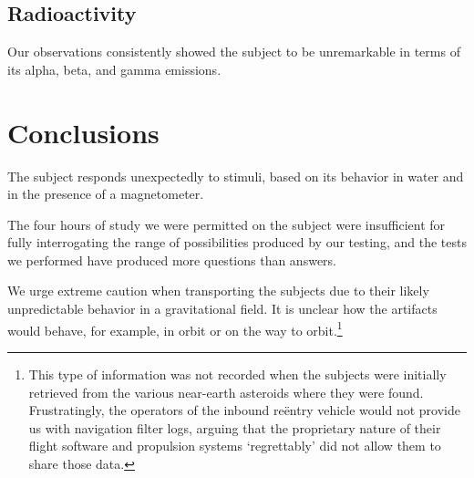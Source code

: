 \documentclass[10pt]{article}
\theoremstyle{definition}
\begin{document}
\subsection{Radioactivity}
Our observations consistently showed the subject to be unremarkable in terms of its alpha, beta, and gamma emissions.

\section{Conclusions}\label{conclusions}
The subject responds unexpectedly to stimuli, based on its behavior in water and in the presence of a magnetometer.

 
The four hours of study we were permitted on the subject were insufficient for fully interrogating the range of possibilities produced by our testing, and the tests we performed have produced more questions than answers.

We urge extreme caution when transporting the subjects due to their likely unpredictable behavior in a gravitational field.
It is unclear how the artifacts would behave, for example, in orbit or on the way to orbit.\footnote{This type of information was not recorded when the subjects were initially retrieved from the various near-earth asteroids where they were found. Frustratingly, the operators of the inbound re\"entry vehicle would not provide us with navigation filter logs, arguing that the proprietary nature of their flight software and propulsion systems `regrettably' did not allow them to share those data.}

%
%
\end{document}
